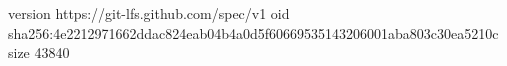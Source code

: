 version https://git-lfs.github.com/spec/v1
oid sha256:4e2212971662ddac824eab04b4a0d5f60669535143206001aba803c30ea5210c
size 43840
